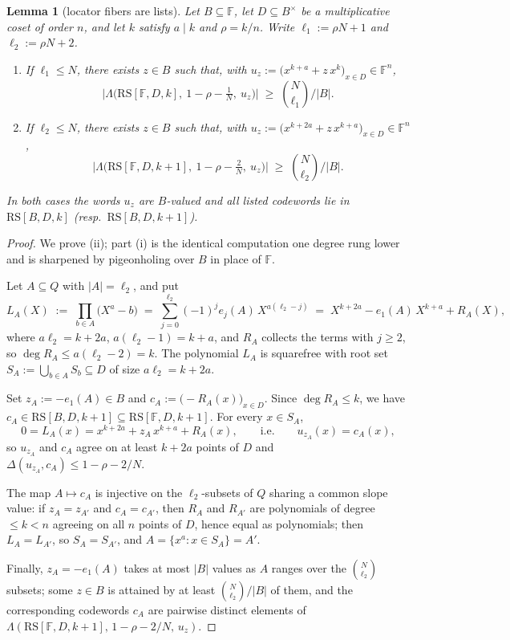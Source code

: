 \documentclass[11pt]{article}
\newtheorem{lemma}[theorem]{Lemma}
\theoremstyle{definition}
\theoremstyle{remark}
\newcommand{\F}{\mathbb{F}}
\newcommand{\B}{B}
\newcommand{\RS}{\mathrm{RS}}
\newcommand{\dist}{\Delta}
\newcommand{\Lst}{\Lambda}
\begin{document}
\begin{lemma}[locator fibers are lists]\label{lem:fiber}
Let $\B\subseteq\F$, let $D\subseteq\B^\times$ be a multiplicative coset of order $n$, and let $k$ satisfy $a\mid k$ and $\rho=k/n$. Write $\ell_1:=\rho N+1$ and $\ell_2:=\rho N+2$.
\begin{enumerate}[label=\textup{(\roman*)}]
\item If $\ell_1\le N$, there exists $z\in\B$ such that, with $u_z:=\bigl(x^{k+a}+z\,x^{k}\bigr)_{x\in D}\in\F^n$,
\[
\bigl|\Lst\bigl(\RS[\F,D,k],\ 1-\rho-\tfrac1N,\ u_z\bigr)\bigr|\;\ge\;\binom{N}{\ell_1}\Big/|\B| .
\]
\item If $\ell_2\le N$, there exists $z\in\B$ such that, with $u_z:=\bigl(x^{k+2a}+z\,x^{k+a}\bigr)_{x\in D}\in\F^n$,
\[
\bigl|\Lst\bigl(\RS[\F,D,k+1],\ 1-\rho-\tfrac2N,\ u_z\bigr)\bigr|\;\ge\;\binom{N}{\ell_2}\Big/|\B| .
\]
\end{enumerate}
In both cases the words $u_z$ are $\B$-valued and all listed codewords lie in $\RS[\B,D,k]$ \textup(resp.\ $\RS[\B,D,k+1]$\textup).
\end{lemma}

\begin{proof}
We prove (ii); part (i) is the identical computation one degree rung lower and is \cite[Main Thm.\,(d)]{Cho26a} sharpened by pigeonholing over $\B$ in place of $\F$.

Let $A\subseteq Q$ with $|A|=\ell_2$, and put
\[
L_A(X)\;:=\;\prod_{b\in A}\bigl(X^a-b\bigr)\;=\;\sum_{j=0}^{\ell_2}(-1)^j e_j(A)\,X^{a(\ell_2-j)}\;=\;X^{k+2a}-e_1(A)\,X^{k+a}+R_A(X),
\]
where $a\ell_2=k+2a$, $a(\ell_2-1)=k+a$, and $R_A$ collects the terms with $j\ge2$, so $\deg R_A\le a(\ell_2-2)=k$. The polynomial $L_A$ is squarefree with root set $S_A:=\bigcup_{b\in A}S_b\subseteq D$ of size $a\ell_2=k+2a$.

Set $z_A:=-e_1(A)\in\B$ and $c_A:=\bigl(-R_A(x)\bigr)_{x\in D}$. Since $\deg R_A\le k$, we have $c_A\in\RS[\B,D,k+1]\subseteq\RS[\F,D,k+1]$. For every $x\in S_A$,
\[
0=L_A(x)=x^{k+2a}+z_A\,x^{k+a}+R_A(x),\qquad\text{i.e.}\qquad u_{z_A}(x)=c_A(x),
\]
so $u_{z_A}$ and $c_A$ agree on at least $k+2a$ points of $D$ and $\dist(u_{z_A},c_A)\le1-\rho-2/N$.

The map $A\mapsto c_A$ is injective on the $\ell_2$-subsets of $Q$ sharing a common slope value: if $z_A=z_{A'}$ and $c_A=c_{A'}$, then $R_A$ and $R_{A'}$ are polynomials of degree $\le k<n$ agreeing on all $n$ points of $D$, hence equal as polynomials; then $L_A=L_{A'}$, so $S_A=S_{A'}$, and $A=\{x^a:x\in S_A\}=A'$.

Finally, $z_A=-e_1(A)$ takes at most $|\B|$ values as $A$ ranges over the $\binom{N}{\ell_2}$ subsets; some $z\in\B$ is attained by at least $\binom{N}{\ell_2}/|\B|$ of them, and the corresponding codewords $c_A$ are pairwise distinct elements of $\Lst(\RS[\F,D,k+1],\,1-\rho-2/N,\,u_z)$.
\end{proof}
\end{document}
